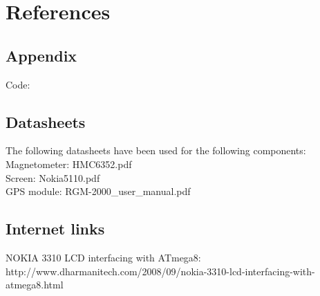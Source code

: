 \chapter{References}


\section{Appendix}

Code:\\

\section{Datasheets}
The following datasheets have been used for the following components:\\
Magnetometer: HMC6352.pdf\\
Screen: Nokia5110.pdf\\
GPS module: RGM-2000\_user\_manual.pdf\\

\section{Internet links}
NOKIA 3310 LCD interfacing with ATmega8: http://www.dharmanitech.com/2008/09/nokia-3310-lcd-interfacing-with-atmega8.html\label{[1]}